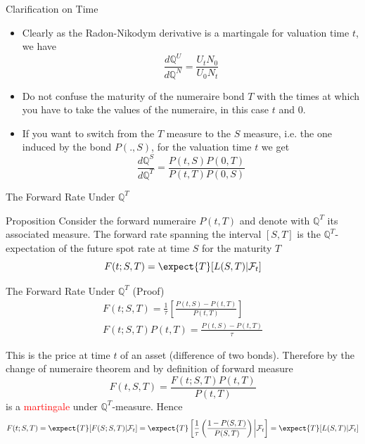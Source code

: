 \documentclass{beamer}
\begin{document}
\begin{frame}{Clarification on Time}
  \begin{itemize}
  \item Clearly as the Radon-Nikodym derivative is a martingale for valuation time $t$, we have
    \begin{equation*}
      \frac{d\mathbb{Q}^U}{d\mathbb{Q}^N}=\frac{U_tN_0}{U_0N_t}
    \end{equation*}
  \item Do not confuse the maturity of the numeraire bond $T$ with the times at which you have to take the values of the numeraire, in this case $t$ and 0.
  \item If you want to switch from the $T$ measure to the $S$ measure, i.e. the one induced by the bond $P(.,S)$, for the valuation time $t$ we get
    \begin{equation*}
      \frac{d\mathbb{Q}^S}{d\mathbb{Q}^T}=\frac{P(t,S)P(0,T)}{P(t,T)P(0,S)}
    \end{equation*}
  \end{itemize}
\end{frame}


\begin{frame}{The Forward Rate Under $\mathbb{Q}^T$}
  \begin{block}{Proposition}
    Consider the forward numeraire $P(t,T)$ and denote with $\mathbb{Q}^T$ its associated measure.
    The forward rate spanning the interval $[S,T]$ is the $\mathbb{Q}^T$-expectation of the future spot rate at time $S$ for the maturity $T$
    \begin{equation}
      F(t;S,T) =\expect{T}[L(S,T)|\mathcal{F}_t]
    \end{equation}
  \end{block}
\end{frame}

\begin{frame}{The Forward Rate Under $\mathbb{Q}^T$ (Proof)}
  \begin{equation*}
    \begin{gathered}
      F(t;S,T) = \frac{1}{\tau}\left[\frac{P(t,S)-P(t,T)}{P(t,T)}\right] \\[0.3cm]
      F(t;S,T)P(t,T) = \frac{P(t,S)-P(t,T)}{\tau}
    \end{gathered}
  \end{equation*}

  This is the price at time $t$ of an asset (difference of two bonds). Therefore by the change of numeraire theorem and by definition of forward measure
  \begin{equation*}
	F(t,S,T) = \frac{F(t;S,T)P(t,T)}{P(t,T)}
  \end{equation*}
  is a \textcolor{red}{martingale} under $\mathbb{Q}^T$-measure. \pause Hence
  \begin{equation*}
    F(t;S,T) = \expect{T}[F(S;S,T)|\mathcal{F}_t] = \expect{T}\left[\frac{1}{\tau}\left(\frac{1-P(S,T)}{P(S,T)}\right)\bigg|\mathcal{F}_t\right] = \expect{T}[L(S,T)|\mathcal{F}_t]
  \end{equation*}
\myendproof
\end{frame}
\end{document}
